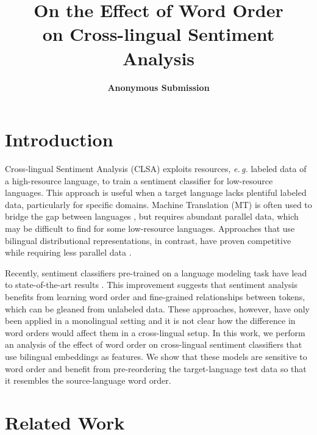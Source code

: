\documentclass[a4paper,11pt,twocolumn,twoside]{article}
\title{On the Effect of Word Order\\on Cross-lingual Sentiment Analysis}
\author {\textbf{Anonymous Submission}}
\newcommand{\eg}{\textit{e.\,g.}\xspace}
\begin{document}

\setlength\titlebox{16cm} %


\label{firstpage} \maketitle

%


\section{Introduction}


Cross-lingual Sentiment Analysis (CLSA) exploits resources, \eg labeled data of a high-resource language, to train a sentiment classifier for low-resource languages. This approach is useful when a target language lacks plentiful labeled data, particularly for specific domains. Machine Translation (MT) is often used to bridge the gap between languages \cite{Banea2008,Balahur2014d}, but requires abundant parallel data, which may be difficult to find for some low-resource languages. Approaches that use bilingual distributional representations, in contrast, have proven competitive while requiring less parallel data \cite{Chen2016,Barnes2018b}.

Recently, sentiment classifiers pre-trained on a language modeling task have lead to state-of-the-art results \cite{Peters2018,Howard2018,Devlin2018}. This improvement suggests that sentiment analysis benefits from learning word order and fine-grained relationships between tokens, which can be gleaned from unlabeled data. These approaches, however, have only been applied in a monolingual setting and it is not clear how the difference in word orders would affect them in a cross-lingual setup. In this work, we perform an analysis of the effect of word order on cross-lingual sentiment classifiers that use bilingual embeddings as features. We show that these models are sensitive to word order and benefit from pre-reordering the target-language test data so that it resembles the source-language word order.


\section{Related Work}
\end{document}
